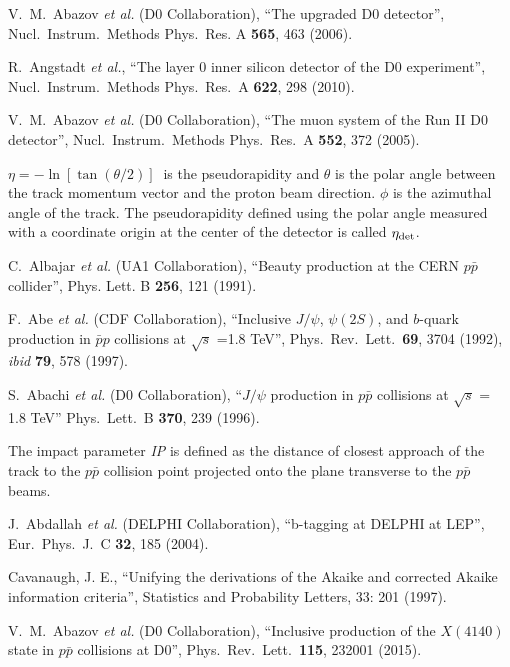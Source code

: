 \documentclass[aps,prd,twocolumn,superscriptaddress,groupedaddress,floatfix]{revtex4}
\begin{document}
\begin{thebibliography}{99}
V.~M.~Abazov  {\it et al.} (D0 Collaboration), ``The upgraded D0 detector'',
Nucl.\ Instrum.\ Methods Phys.\ Res. A {\bf 565}, 463  (2006).

R.~Angstadt {\it et al.},  ``The layer 0 inner silicon detector of the D0 experiment'', 
Nucl.\ Instrum.\ Methods Phys.\ Res.\ A {\bf 622}, 298   (2010).


  V.~M.~Abazov {\it et al.} (D0 Collaboration),  
``The muon system of the Run II D0 detector'', 
Nucl.\ Instrum.\ Methods Phys.\ Res.\ A {\bf 552}, 372   (2005).


$\eta=-\ln[\tan(\theta/2)]\ $ is the pseudorapidity and $\theta$ is
the polar angle between the track momentum vector and the proton beam direction. $\phi$ is the azimuthal angle 
of the track.
The pseudorapidity defined using the polar angle measured with a coordinate origin at
 the center of the detector is called  $\eta_{\rm det} $.


 C.~Albajar {\it et al.} (UA1 Collaboration), 
``Beauty production at the CERN $p \bar p$   collider'',
Phys. Lett. B {\bf 256}, 121 (1991).


 F.~Abe  {\it et al.} (CDF Collaboration), 
``Inclusive $J/\psi$, $\psi(2S)$, and $b$-quark production in $\bar p p$  collisions at $\sqrt s$ =1.8 TeV'',
Phys.\ Rev.\  Lett.\ {\bf 69}, 3704 (1992), {\sl ibid} {\bf 79}, 578 (1997).

 S.~Abachi  {\it et al.} (D0 Collaboration),
``$J/\psi$ production in $p \bar p$ collisions at $\sqrt s$ = 1.8 TeV''
 Phys.\ Lett.\ B {\bf 370}, 239 (1996).


 
 The impact parameter {\sl IP} is defined as the distance of closest
 approach of the track to the $p\bar{p}$
 collision point projected onto the plane transverse to the $p\bar{p}$ beams.


   J.~Abdallah {\it et al.}  (DELPHI Collaboration),
 ``b-tagging at DELPHI at LEP'', 
  Eur.\ Phys.\ J.\ C {\bf 32}, 185 (2004).


 Cavanaugh, J. E., ``Unifying the derivations of the Akaike and corrected Akaike information criteria'', Statistics and Probability Letters, 33: 201 (1997).


  V.~M.~Abazov {\it et al.} (D0 Collaboration),
``Inclusive production of the $X(4140)$ state in $p \bar p$ collisions  at D0'',
Phys.\ Rev.\  Lett.\ {\bf 115}, 232001 (2015).

\end{thebibliography}
\end{document}
